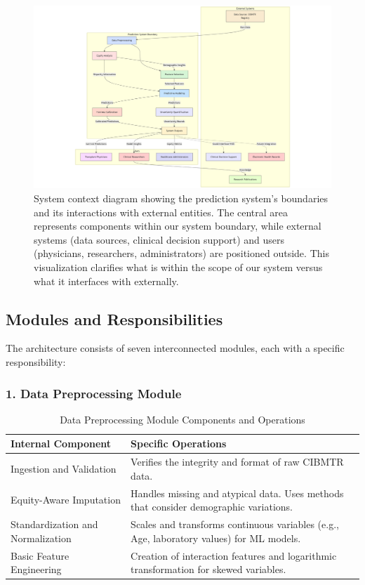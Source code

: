 \begin{figure}[H]
    \centering
    \includegraphics[width=1\textwidth]{figures/SystemContextDiagram.png}
    \caption{System context diagram showing the prediction system's boundaries and its interactions with external entities. The central area represents components within our system boundary, while external systems (data sources, clinical decision support) and users (physicians, researchers, administrators) are positioned outside. This visualization clarifies what is within the scope of our system versus what it interfaces with externally.}
    \label{fig:system_context_diagram}
\end{figure}

\subsection{Modules and Responsibilities}

The architecture consists of seven interconnected modules, each with a specific responsibility:

\subsubsection{1. Data Preprocessing Module}

\begin{table}[H]
\centering
\begin{tabular}{|p{5cm}|p{9cm}|}
\hline
\textbf{Internal Component} & \textbf{Specific Operations} \\
\hline
Ingestion and Validation & Verifies the integrity and format of raw CIBMTR data. \\
\hline
Equity-Aware Imputation & Handles missing and atypical data. Uses methods that consider demographic variations. \\
\hline
Standardization and Normalization & Scales and transforms continuous variables (e.g., Age, laboratory values) for ML models. \\
\hline
Basic Feature Engineering & Creation of interaction features and logarithmic transformation for skewed variables. \\
\hline
\end{tabular}
\caption{Data Preprocessing Module Components and Operations}
\label{tab:preprocessing_module}
\end{table}

